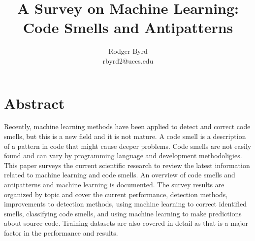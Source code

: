 \documentclass[conference]{IEEEtran}
\begin{document}

\title{A Survey on Machine Learning: Code Smells and Antipatterns}
\author{Rodger Byrd\\rbyrd2@uccs.edu}

\maketitle

\section*{Abstract}
Recently, machine learning methods have been applied to detect and correct code smells, but this is a new field and it is not mature. 
A code smell is a description of a pattern in code that might cause deeper problems. 
Code smells are not easily found and can vary by programming language and development methodoligies.
This paper surveys the current scientific research to review the latest information related to machine learning and code smells. 
An overview of code smells and antipatterns and machine learning is documented. The survey results are organized by topic and cover the current performance, detection methods, improvements to detection methods, using machine learning to correct identified smells, classifying code smells, and using machine learning to make predictions about source code. 
Training datasets are also covered in detail as that is a major factor in the performance and results.
\end{document}
